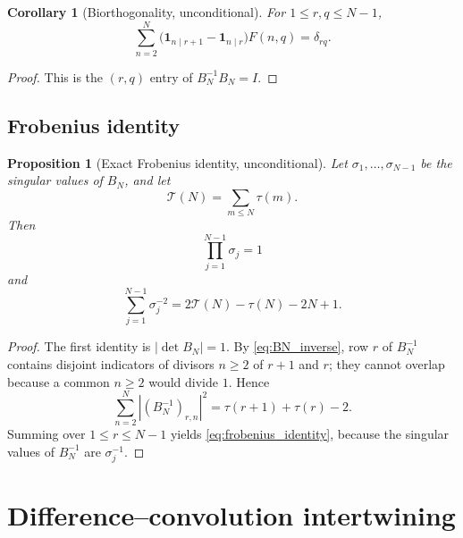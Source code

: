 \documentclass[11pt]{amsart}
\numberwithin{equation}{section}
\theoremstyle{plain}
\newtheorem{proposition}[theorem]{Proposition}
\newtheorem{corollary}[theorem]{Corollary}
\theoremstyle{definition}
\theoremstyle{remark}
\newcommand{\one}{\mathbf 1}
\newcommand{\Fsurf}{F}
\newcommand{\TauSum}{\mathcal T}
\begin{document}
\begin{corollary}[Biorthogonality, unconditional]
\label{cor:biorthogonality}
For $1\le r,q\le N-1$,
\begin{equation}
\sum_{n=2}^{N}
\bigl(\one_{n\mid r+1}-\one_{n\mid r}\bigr)\Fsurf(n,q)
=\delta_{rq}.
\label{eq:biorthogonality}
\end{equation}
\end{corollary}

\begin{proof}
This is the $(r,q)$ entry of $B_N^{-1}B_N=I$.
\end{proof}

\subsection{Frobenius identity}
\label{subsec:frobenius}

\begin{proposition}[Exact Frobenius identity, unconditional]
\label{prop:frobenius}
Let $\sigma_1,\ldots,\sigma_{N-1}$ be the singular values of $B_N$, and let
\begin{equation}
\TauSum(N)=\sum_{m\le N}\tau(m).
\label{eq:tau_summatory}
\end{equation}
Then
\begin{equation}
\prod_{j=1}^{N-1}\sigma_j=1
\label{eq:singular_product}
\end{equation}
and
\begin{equation}
\sum_{j=1}^{N-1}\sigma_j^{-2}
=2\TauSum(N)-\tau(N)-2N+1.
\label{eq:frobenius_identity}
\end{equation}
\end{proposition}

\begin{proof}
The first identity is $|\det B_N|=1$.  By \eqref{eq:BN_inverse}, row $r$ of $B_N^{-1}$ contains disjoint indicators of divisors $n\ge2$ of $r+1$ and $r$; they cannot overlap because a common $n\ge2$ would divide $1$.  Hence
\begin{equation}
\sum_{n=2}^{N}|(B_N^{-1})_{r,n}|^2
=\tau(r+1)+\tau(r)-2.
\label{eq:inverse_row_norm}
\end{equation}
Summing over $1\le r\le N-1$ yields \eqref{eq:frobenius_identity}, because the singular values of $B_N^{-1}$ are $\sigma_j^{-1}$.
\end{proof}

\section{Difference--convolution intertwining}
\label{sec:intertwining}
\end{document}
